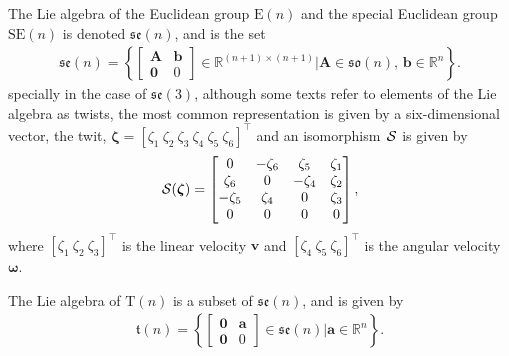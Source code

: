 \begin{example}
    The Lie algebra of the Euclidean group $\text{E}(n)$ and the special Euclidean group $\text{SE}(n)$ is denoted $\mathfrak{se}(n)$, and is the set 
    \begin{align*}
        \mathfrak{se}(n) = \left\{\begin{bmatrix}
            \mathbf{A} & \mathbf{b} \\ \mathbf{0} & 0
        \end{bmatrix} \in \mathbb{R}^{(n+1)\times(n+1)} | \mathbf{A}\in\mathfrak{so}(n),\, \mathbf{b}\in\mathbb{R}^n\right\}.
    \end{align*}
    specially in the case of $\mathfrak{se}(3)$, although some texts refer to elements of the Lie algebra as twists, the most common representation is given by a six-dimensional vector, the twit, $\boldsymbol{\zeta} = [\zeta_1\ \zeta_2\ \zeta_3\ \zeta_4\ \zeta_5\ \zeta_6]^\top$ and an isomorphism $\SL$ is given by
    \begin{align*}
        \SL[\boldsymbol{\zeta}] = \begin{bmatrix}
            0 & -\zeta_6 & \zeta_5 & \zeta_1 \\
            \zeta_6 & 0 & -\zeta_4 & \zeta_2 \\
            -\zeta_5 & \zeta_4 & 0 & \zeta_3 \\
            0 & 0 & 0 & 0
        \end{bmatrix},
    \end{align*}
    where $[\zeta_1\ \zeta_2\ \zeta_3]^\top$ is the linear velocity $\mathbf{v}$ and $[\zeta_4\ \zeta_5\ \zeta_6]^\top$ is the angular velocity $\boldsymbol{\omega}$.
\end{example}
\begin{example}
    The Lie algebra of $\text{T}(n)$ is a subset of $\mathfrak{se}(n)$, and is given by
    \begin{align*}
        \mathfrak{t}(n) = \left\{\begin{bmatrix}
            \mathbf{0} & \mathbf{a} \\ \mathbf{0} & 0
        \end{bmatrix} \in \mathfrak{se}(n) | \mathbf{a}\in\mathbb{R}^n\right\}.
    \end{align*} 
\end{example}
